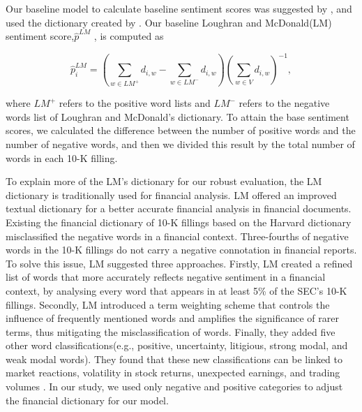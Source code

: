 \documentclass[logo,bsc,singlespacing,parskip]{infthesis}
\begin{document}
Our baseline model to calculate baseline sentiment scores was suggested by \cite{Garcia2013}, and used the dictionary created by \cite{LoughranMcDonald2011}. Our baseline Loughran and McDonald(LM) sentiment score,$\hat{p}^{LM}$ , is computed as

\begin{equation} \label{5.2}
\hat{p}_i^{LM} = \left( \sum_{w \in LM^+} d_{i,w} - \sum_{w \in LM^-} d_{i,w} \right) \left( \sum_{w \in V} d_{i,w} \right)^{-1},
\end{equation}

where $LM^{+}$ refers to the positive word lists and $LM^{-}$ refers to the negative words list of Loughran and McDonald’s dictionary. To attain the base sentiment scores, we calculated the difference between the number of positive words and the number of negative words, and then we divided this result by the total number of words in each 10-K filling.   

To explain more of the LM’s dictionary for our robust evaluation, the LM dictionary is traditionally used for financial analysis. LM offered an improved textual dictionary for a better accurate financial analysis in financial documents. Existing the financial dictionary of 10-K fillings based on the Harvard dictionary misclassified the negative words in a financial context. Three-fourths of negative words in the 10-K fillings do not carry a negative connotation in financial reports. To solve this issue, LM suggested three approaches. Firstly, LM created a refined list of words that more accurately reflects negative sentiment in a financial context, by analysing every word that appears in at least 5\% of the SEC’s 10-K fillings. Secondly, LM introduced a term weighting scheme that controls the influence of frequently mentioned words and amplifies the significance of rarer terms, thus mitigating the misclassification of words. Finally, they added five other word classifications(e.g., positive, uncertainty, litigious, strong modal, and weak modal words). They found that these new classifications can be linked to market reactions, volatility in stock returns, unexpected earnings, and trading volumes \cite{LoughranMcDonald2011}. In our study, we used only negative and positive categories to adjust the financial dictionary for our model.
\end{document}
